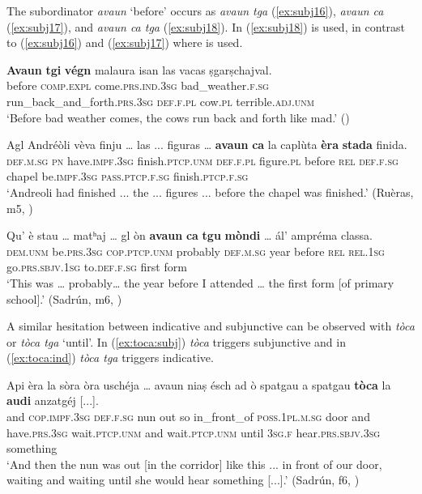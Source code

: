 The subordinator \textit{avaun} `before' occurs as \textit{avaun tga} (\ref{ex:subj16}), \textit{avaun ca} (\ref{ex:subj17}), and \textit{avaun ca tga} (\ref{ex:subj18}). In (\ref{ex:subj18})  is used, in contrast to (\ref{ex:subj16}) and (\ref{ex:subj17}) where  is used.

\ea
\label{ex:subj16}
\gll   \textbf{Avaun} \textbf{tgi} \textbf{végn} malaura isan las vacas ṣgarṣchajval.\\
before \textsc{comp.expl} come.\textsc{prs.ind.3sg} bad\_weather.\textsc{f.sg} run\_back\_and\_forth.\textsc{prs.3sg} \textsc{def.f.pl} cow.\textsc{pl} terrible.\textsc{adj.unm} \\
\glt `Before bad weather comes, the cows run back and forth like mad.' ()
\z

\ea
\label{ex:subj17}
\gll  Agl Andréòli vèva finju … las ... figuras … \textbf{avaun} \textbf{ca} la caplùta \textbf{èra} \textbf{stada} finida.\\
\textsc{def.m.sg} \textsc{pn} have.\textsc{impf.3sg} finish.\textsc{ptcp.unm} {} \textsc{def.f.pl} {} figure.\textsc{pl} {} before \textsc{rel} \textsc{def.f.sg} chapel be.\textsc{impf.3sg} \textsc{pass.ptcp.f.sg} finish.\textsc{ptcp.f.sg} \\
\glt `Andreoli had finished ... the ... figures ... before the chapel was finished.' (Ruèras, m5, )
\z

\ea
\label{ex:subj18}
\gll    Qu’ è stau … matʰaj … gl òn \textbf{avaun} \textbf{ca} \textbf{tgu} \textbf{mòndi} … ál’ ampréma classa.\\
\textsc{dem.unm} be.\textsc{prs.3sg} \textsc{cop.ptcp.unm} {} probably {} \textsc{def.m.sg} year before \textsc{rel} \textsc{rel.1sg} go.\textsc{prs.sbjv.1sg} {} to.\textsc{def.f.sg} first form\\
\glt `This was … probably… the year before I attended … the first form [of primary school].' (Sadrún, m6, )
\z


A similar hesitation between indicative and subjunctive can be observed with \textit{tòca} or \textit{tòca tga} `until'. In (\ref{ex:toca:subj}) \textit{tòca} triggers subjunctive and in (\ref{ex:toca:ind}) \textit{tòca tga} triggers indicative.

\ea
\label{ex:toca:subj}
\gll    Api èra la sòra òra uschéja … avaun niaṣ ésch ad ò spatgau a spatgau \textbf{tòca} la \textbf{audi} anzatgéj [...].\\
and \textsc{cop.impf.3sg} \textsc{def.f.sg} nun out so {} in\_front\_of \textsc{poss.1pl.m.sg} door and have.\textsc{prs.3sg} wait.\textsc{ptcp.unm} and wait.\textsc{ptcp.unm} until \textsc{3sg.f} hear.\textsc{prs.sbjv.3sg} something\\
\glt `And then the nun was out [in the corridor] like this ... in front of our door, waiting and waiting until she would hear something [...].' (Sadrún, f6, )
\z

